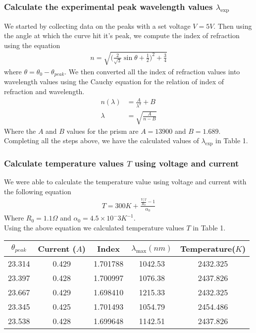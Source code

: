 \documentclass{article}
\begin{document}
\subsubsection*{Calculate the experimental peak wavelength values $\lambda_{\exp}$}
We started by collecting data on the peaks with a set voltage $V = 5V$. Then
using the angle at which the curve hit it's peak, we compute the index of refraction
using the equation
\begin{align*}
    n = \sqrt{\bigg(\frac{2}{\sqrt{3}} \sin\theta + \frac{1}{2}\bigg)^2 + \frac{3}{4}}
\end{align*}
where $\theta = \theta_0 - \theta_{peak}$. We then converted all the index of
refraction values into wavelength values using the Cauchy equation for the relation
of index of refraction and wavelength.
\begin{align*}
    n(\lambda) &= \frac{A}{\lambda^2} + B\\
    \lambda &= \sqrt{\frac{A}{n - B}}
\end{align*}
Where the $A$ and $B$ values for the prism are $A = 13900$ and $B = 1.689$. 
Completing all the steps above, we have the calculated values of $\lambda_{\exp}$
in Table 1.

\subsubsection*{Calculate temperature values $T$ using voltage and current}
We were able to calculate the temperature value using voltage and current with
the following equation
\begin{align*}
    T = 300K + \frac{\frac{V / I}{R_0} - 1}{\alpha_0}
\end{align*}
Where $R_0 = 1.1\Omega$ and $\alpha_0 = 4.5\times 10^-3 K^{-1}$.\\
Using the above equation we calculated temperature values $T$ in Table 1.
\begin{center}
    \begin{tabular}{ c | c | c | c | c}
    $\theta_{peak}$ & Current ($A$) & Index & $\lambda_{\max} (nm)$ & Temperature($K$)\\
    \hline 
    23.314  &  0.429  &  1.701788  &  1042.53  &  2432.325 \\
    23.397  &  0.428  &  1.700997  &  1076.38  &  2437.826 \\
    23.667  &  0.429  &  1.698410  &  1215.33  &  2432.325 \\
    23.345  &  0.425  &  1.701493  &  1054.79  &  2454.486 \\
    23.538  &  0.428  &  1.699648  &  1142.51  &  2437.826 
    \end{tabular}
\end{center}
\newpage
\end{document}
